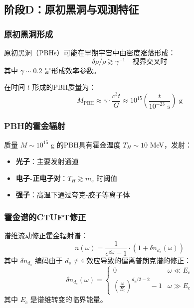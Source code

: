 \subsection{阶段D：原初黑洞与观测特征}
\label{subsec:stageD_primordial}

\subsubsection{原初黑洞形成}

原初黑洞（PBHs）可能在早期宇宙中由密度涨落形成：
\begin{equation}
    \delta \rho/\rho \gtrsim \gamma^{-1} \quad \text{视界交叉时}
\end{equation}
其中 $\gamma \sim 0.2$ 是形成效率参数。

在时间 $t$ 形成的PBH质量为：
\begin{equation}
    M_{\text{PBH}} \approx \gamma \cdot \frac{c^3 t}{G} \approx 10^{15} \left(\frac{t}{10^{-23} \text{ s}}\right) \text{ g}
\end{equation}

\subsubsection{PBH的霍金辐射}

质量 $M \sim 10^{15}$ g 的PBH具有霍金温度 $T_H \sim 10$ MeV，发射：
\begin{itemize}
    \item \textbf{光子}：主要发射通道
    \item \textbf{电子-正电子对}：$T_H \gtrsim m_e$ 时阈值
    \item \textbf{强子}：高温下通过夸克-胶子等离子体
\end{itemize}

\subsubsection{霍金谱的CTUFT修正}

\begin{theorem}[CTUFT修正霍金谱]
谱维流动修正霍金辐射谱：
\begin{equation}
    n(\omega) = \frac{1}{e^{\beta\omega} - 1} \cdot \left(1 + \delta n_{d_s}(\omega)\right)
\end{equation}
其中 $\delta n_{d_s}$ 编码由于 $d_s \neq 4$ 效应导致的偏离普朗克谱的修正：
\begin{equation}
    \delta n_{d_s}(\omega) = \begin{cases}
        0 & \omega \ll E_c \\
        \left(\frac{\omega}{E_c}\right)^{d_s/2 - 2} - 1 & \omega \gg E_c
    \end{cases}
\end{equation}
其中 $E_c$ 是谱维转变的临界能量。
\end{theorem}

